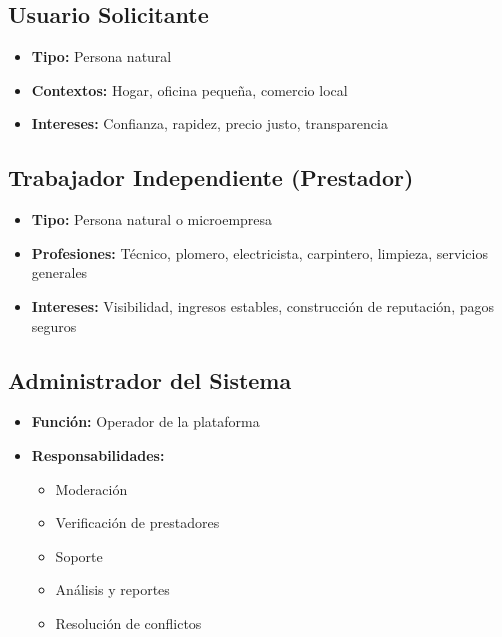 \documentclass[12pt,a4paper,spanish]{article}
\begin{document}
\subsection{Usuario Solicitante}

\begin{itemize}
    \item \textbf{Tipo:} Persona natural
    \item \textbf{Contextos:} Hogar, oficina pequeña, comercio local
    \item \textbf{Intereses:} Confianza, rapidez, precio justo, transparencia
\end{itemize}

\subsection{Trabajador Independiente (Prestador)}

\begin{itemize}
    \item \textbf{Tipo:} Persona natural o microempresa
    \item \textbf{Profesiones:} Técnico, plomero, electricista, carpintero, limpieza, servicios generales
    \item \textbf{Intereses:} Visibilidad, ingresos estables, construcción de reputación, pagos seguros
\end{itemize}

\subsection{Administrador del Sistema}

\begin{itemize}
    \item \textbf{Función:} Operador de la plataforma
    \item \textbf{Responsabilidades:}
        \begin{itemize}
            \item Moderación
            \item Verificación de prestadores
            \item Soporte
            \item Análisis y reportes
            \item Resolución de conflictos
        \end{itemize}
\end{itemize}

\newpage
\end{document}
